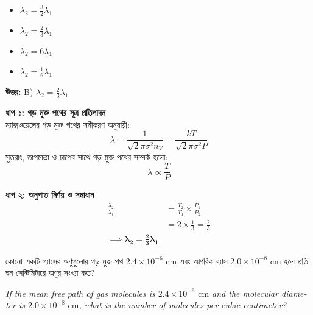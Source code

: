\documentclass[12pt, a4paper]{article}
\begin{document}
\begin{itemize}[label={}, leftmargin=1cm, itemsep=0.5em]
    \item[\textbf{A)}] $\lambda_2 = \frac{3}{2} \lambda_1$
    \item[\textbf{B)}] $\lambda_2 = \frac{2}{3} \lambda_1$
    \item[\textbf{C)}] $\lambda_2 = 6 \lambda_1$
    \item[\textbf{D)}] $\lambda_2 = \frac{1}{6} \lambda_1$
\end{itemize}

\vspace{0.5em}
\begin{tcolorbox}[answerbox]
    \textbf{\color{success} উত্তর:} B) $\lambda_2 = \frac{2}{3} \lambda_1$
\end{tcolorbox}
\vspace{1em}

\begin{tcolorbox}[solutionbox={সমাধান (Solution)}]
    \noindent
    \textbf{ধাপ ১: গড় মুক্ত পথের সূত্র প্রতিপাদন} \\
    ম্যাক্সওয়েলের গড় মুক্ত পথের সমীকরণ অনুযায়ী:
    \[ \lambda = \frac{1}{\sqrt{2} \pi \sigma^2 n_V} = \frac{k T}{\sqrt{2} \pi \sigma^2 P} \]
    সুতরাং, তাপমাত্রা ও চাপের সাথে গড় মুক্ত পথের সম্পর্ক হলো:
    \[ \lambda \propto \frac{T}{P} \]
    
    \vspace{0.4em}
    \noindent\textbf{ধাপ ২: অনুপাত নির্ণয় ও সমাধান}
    \begin{align*}
        \frac{\lambda_2}{\lambda_1} &= \frac{T_2}{T_1} \times \frac{P_1}{P_2} \\
        &= 2 \times \frac{1}{3} = \frac{2}{3} \\
        \implies \boldsymbol{\lambda_2 = \frac{2}{3} \lambda_1}
    \end{align*}
\end{tcolorbox}

\vspace{2em}

\begin{tcolorbox}[questionbox={প্রশ্ন (Question) 10}]
    \noindent
    কোনো একটি গ্যাসের অণুগুলোর গড় মুক্ত পথ $2.4 \times 10^{-6}\text{ cm}$ এবং আণবিক ব্যাস $2.0 \times 10^{-8}\text{ cm}$ হলে প্রতি ঘন সেন্টিমিটারে অণুর সংখ্যা কত?
    
    \vspace{0.8em}
    \begin{english}
    \noindent\textit{\color{darkgray}
    If the mean free path of gas molecules is $2.4 \times 10^{-6}\text{ cm}$ and the molecular diameter is $2.0 \times 10^{-8}\text{ cm}$, what is the number of molecules per cubic centimeter?
    }
    \end{english}
\end{tcolorbox}
\end{document}
